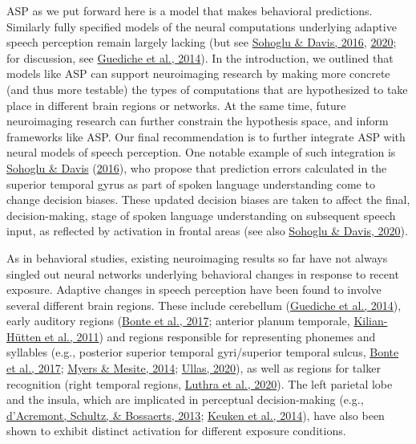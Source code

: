 \documentclass[
  11pt,
  english,
  man,floatsintext]{apa6}
\begin{document}
ASP as we put forward here is a model that makes behavioral predictions. Similarly fully specified models of the neural computations underlying adaptive speech perception remain largely lacking (but see \protect\hyperlink{ref-sohoglu-davis2016}{Sohoglu \& Davis, 2016}, \protect\hyperlink{ref-sohoglu-davis2020}{2020}; for discussion, see \protect\hyperlink{ref-guediche2014}{Guediche et al., 2014}). In the introduction, we outlined that models like ASP can support neuroimaging research by making more concrete (and thus more testable) the types of computations that are hypothesized to take place in different brain regions or networks. At the same time, future neuroimaging research can further constrain the hypothesis space, and inform frameworks like ASP. Our final recommendation is to further integrate ASP with neural models of speech perception. One notable example of such integration is \protect\hyperlink{ref-sohoglu-davis2016}{Sohoglu \& Davis} (\protect\hyperlink{ref-sohoglu-davis2016}{2016}), who propose that prediction errors calculated in the superior temporal gyrus as part of spoken language understanding come to change decision biases. These updated decision biases are taken to affect the final, decision-making, stage of spoken language understanding on subsequent speech input, as reflected by activation in frontal areas (see also \protect\hyperlink{ref-sohoglu-davis2020}{Sohoglu \& Davis, 2020}).

As in behavioral studies, existing neuroimaging results so far have not always singled out neural networks underlying behavioral changes in response to recent exposure. Adaptive changes in speech perception have been found to involve several different brain regions. These include cerebellum (\protect\hyperlink{ref-guediche2014}{Guediche et al., 2014}), early auditory regions (\protect\hyperlink{ref-bonte2017}{Bonte et al., 2017}; anterior planum temporale, \protect\hyperlink{ref-kilianhutten2011}{Kilian-Hütten et al., 2011}) and regions responsible for representing phonemes and syllables (e.g., posterior superior temporal gyri/superior temporal sulcus, \protect\hyperlink{ref-bonte2017}{Bonte et al., 2017}; \protect\hyperlink{ref-myers-mesite2014}{Myers \& Mesite, 2014}; \protect\hyperlink{ref-ullas2020}{Ullas, 2020}), as well as regions for talker recognition (right temporal regions, \protect\hyperlink{ref-luthra2020a}{Luthra et al., 2020}). The left parietal lobe and the insula, which are implicated in perceptual decision-making (e.g., \protect\hyperlink{ref-dacremont2013}{d'Acremont, Schultz, \& Bossaerts, 2013}; \protect\hyperlink{ref-keuken2014}{Keuken et al., 2014}), have also been shown to exhibit distinct activation for different exposure conditions.
\end{document}
